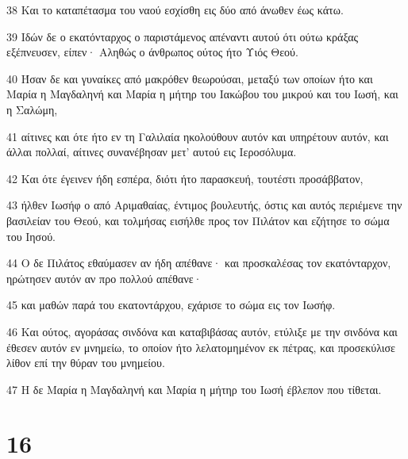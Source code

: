 \par 38 Και το καταπέτασμα του ναού εσχίσθη εις δύο από άνωθεν έως κάτω.
\par 39 Ιδών δε ο εκατόνταρχος ο παριστάμενος απέναντι αυτού ότι ούτω κράξας εξέπνευσεν, είπεν· Αληθώς ο άνθρωπος ούτος ήτο Υιός Θεού.
\par 40 Ήσαν δε και γυναίκες από μακρόθεν θεωρούσαι, μεταξύ των οποίων ήτο και Μαρία η Μαγδαληνή και Μαρία η μήτηρ του Ιακώβου του μικρού και του Ιωσή, και η Σαλώμη,
\par 41 αίτινες και ότε ήτο εν τη Γαλιλαία ηκολούθουν αυτόν και υπηρέτουν αυτόν, και άλλαι πολλαί, αίτινες συνανέβησαν μετ' αυτού εις Ιεροσόλυμα.
\par 42 Και ότε έγεινεν ήδη εσπέρα, διότι ήτο παρασκευή, τουτέστι προσάββατον,
\par 43 ήλθεν Ιωσήφ ο από Αριμαθαίας, έντιμος βουλευτής, όστις και αυτός περιέμενε την βασιλείαν του Θεού, και τολμήσας εισήλθε προς τον Πιλάτον και εζήτησε το σώμα του Ιησού.
\par 44 Ο δε Πιλάτος εθαύμασεν αν ήδη απέθανε· και προσκαλέσας τον εκατόνταρχον, ηρώτησεν αυτόν αν προ πολλού απέθανε·
\par 45 και μαθών παρά του εκατοντάρχου, εχάρισε το σώμα εις τον Ιωσήφ.
\par 46 Και ούτος, αγοράσας σινδόνα και καταβιβάσας αυτόν, ετύλιξε με την σινδόνα και έθεσεν αυτόν εν μνημείω, το οποίον ήτο λελατομημένον εκ πέτρας, και προσεκύλισε λίθον επί την θύραν του μνημείου.
\par 47 Η δε Μαρία η Μαγδαληνή και Μαρία η μήτηρ του Ιωσή έβλεπον που τίθεται.

\chapter{16}

